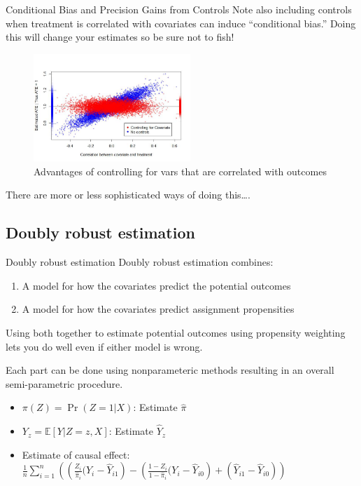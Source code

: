 \documentclass[
  11pt,
  ignorenonframetext,
]{beamer}
\providecommand{\tightlist}{%
  \setlength{\itemsep}{0pt}\setlength{\parskip}{0pt}}\usepackage{longtable,booktabs,array}
\begin{document}
\begin{frame}{Conditional Bias and Precision Gains from Controls}
\protect\hypertarget{conditional-bias-and-precision-gains-from-controls-2}{}
Note also including controls when treatment is correlated with
covariates can induce ``conditional bias.'' Doing this will change your
estimates so be sure not to fish!

\begin{figure}

{\centering \includegraphics[width=2.33in,height=\textheight]{figs/cb.jpg}

}

\caption{Advantages of controlling for vars that are correlated with
outcomes}

\end{figure}

There are more or less sophisticated ways of doing this\ldots.
\end{frame}

\hypertarget{doubly-robust-estimation}{%
\subsection{Doubly robust estimation}\label{doubly-robust-estimation}}

\begin{frame}{Doubly robust estimation}
\protect\hypertarget{doubly-robust-estimation-1}{}
Doubly robust estimation combines:

\begin{enumerate}
\tightlist
\item
  A model for how the covariates predict the potential outcomes
\item
  A model for how the covariates predict assignment propensities
\end{enumerate}

Using both together to estimate potential outcomes using propensity
weighting lets you do well even if either model is wrong.

Each part can be done using nonparameteric methods resulting in an
overall semi-parametric procedure.

\begin{itemize}
\tightlist
\item
  \(\pi(Z) = \Pr(Z=1|X)\): Estimate \(\hat\pi\)
\item
  \(Y_z = \mathbb{E}[Y|Z=z, X]\): Estimate \(\hat{Y}_z\)
\item
  Estimate of causal effect:
  \(\frac{1}{n}\sum_{i=1}^n\left(\left(\frac{Z_i}{\hat{\pi}_i}(Y_i - \hat{Y}_{i1}\right) - \left(\frac{1-Z_i}{1-\hat{\pi}_i}(Y_i - \hat{Y}_{i0}\right) + \left(\hat{Y}_{i1} - \hat{Y}_{i0}\right) \right)\)
\end{itemize}
\end{frame}
\end{document}
